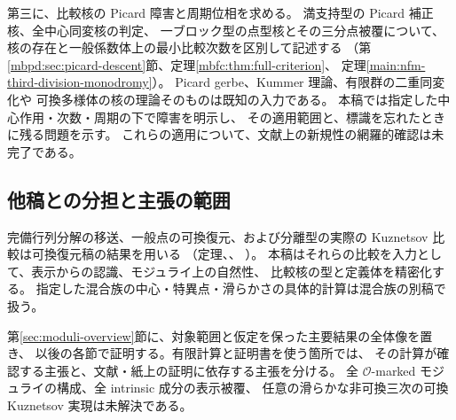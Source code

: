 第三に、比較核の Picard 障害と周期位相を求める。
満支持型の Picard 補正核、全中心同変核の判定、
一ブロック型の点型核とその三分点被覆について、
核の存在と一般係数体上の最小比較次数を区別して記述する
（第\ref{mbpd:sec:picard-descent}節、定理\ref{mbfc:thm:full-criterion}、
定理\ref{main:nfm-third-division-monodromy}）。
Picard gerbe、Kummer 理論、有限群の二重同変化\cite{MEDElagin}や
可換多様体の核の理論\cite{MBFCOrlovAbelian}そのものは既知の入力である。
本稿では指定した中心作用・次数・周期の下で障害を明示し、
その適用範囲と、標識を忘れたときに残る問題を示す。
これらの適用について、文献上の新規性の網羅的確認は未完了である。

\subsection{他稿との分担と主張の範囲}

完備行列分解の移送、一般点の可換復元、および分離型の実際の
Kuznetsov 比較は可換復元稿の結果を用いる
（定理、、
）。
本稿はそれらの比較を入力として、表示からの認識、モジュライ上の自然性、
比較核の型と定義体を精密化する。
指定した混合族の中心・特異点・滑らかさの具体的計算は混合族の別稿で扱う。

第\ref{sec:moduli-overview}節に、対象範囲と仮定を保った主要結果の全体像を置き、
以後の各節で証明する。有限計算と証明書を使う箇所では、
その計算が確認する主張と、文献・紙上の証明に依存する主張を分ける。
全 $\mathcal O$-marked モジュライの構成、全 intrinsic 成分の表示被覆、
任意の滑らかな非可換三次の可換 Kuznetsov 実現は未解決である。

\PaperReferenceGuide
